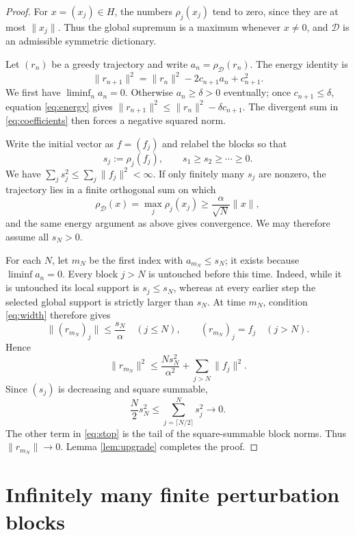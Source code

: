 \documentclass[11pt]{article}
\newcommand{\D}{\mathcal D}
\newcommand{\rhoD}{\rho_{\mathcal D}}
\begin{document}
\begin{proof}
For $x=(x_j)\in H$, the numbers $\rho_j(x_j)$ tend to zero, since they are at
most $\|x_j\|$.  Thus the global supremum is a maximum whenever $x\ne0$, and
$\D$ is an admissible symmetric dictionary.

Let $(r_n)$ be a greedy trajectory and write $a_n=\rhoD(r_n)$.  The energy
identity is
\begin{equation}\label{eq:energy}
 \|r_{n+1}\|^2
 =\|r_n\|^2-2c_{n+1}a_n+c_{n+1}^2.
\end{equation}
We first have $\liminf_n a_n=0$.  Otherwise $a_n\ge\delta>0$ eventually; once
$c_{n+1}\le\delta$, equation \eqref{eq:energy} gives
$\|r_{n+1}\|^2\le\|r_n\|^2-\delta c_{n+1}$.  The divergent sum in
\eqref{eq:coefficients} then forces a negative squared norm.

Write the initial vector as $f=(f_j)$ and relabel the blocks so that
\[
 s_j:=\rho_j(f_j),\qquad s_1\ge s_2\ge\cdots\ge0.
\]
We have $\sum_j s_j^2\le\sum_j\|f_j\|^2<\infty$.  If only finitely many
$s_j$ are nonzero, the trajectory lies in a finite orthogonal sum on which
\[
 \rhoD(x)=\max_j\rho_j(x_j)
 \ge\frac{\alpha}{\sqrt N}\|x\|,
\]
and the same energy argument as above gives convergence.  We may therefore
assume all $s_N>0$.

For each $N$, let $m_N$ be the first index with $a_{m_N}\le s_N$; it exists
because $\liminf a_n=0$.  Every block $j>N$ is untouched before this time.
Indeed, while it is untouched its local support is $s_j\le s_N$, whereas at
every earlier step the selected global support is strictly larger than $s_N$.
At time $m_N$, condition \eqref{eq:width} therefore gives
\[
 \|(r_{m_N})_j\|\le\frac{s_N}{\alpha}\quad(j\le N),
 \qquad (r_{m_N})_j=f_j\quad(j>N).
\]
Hence
\begin{equation}\label{eq:stop}
 \|r_{m_N}\|^2
 \le \frac{N s_N^2}{\alpha^2}+\sum_{j>N}\|f_j\|^2.
\end{equation}
Since $(s_j)$ is decreasing and square summable,
\[
 \frac N2s_N^2\le
 \sum_{j=\lceil N/2\rceil}^{N}s_j^2\longrightarrow0.
\]
The other term in \eqref{eq:stop} is the tail of the square-summable block
norms.  Thus $\|r_{m_N}\|\to0$.  Lemma \ref{lem:upgrade} completes the proof.
\end{proof}

\section{Infinitely many finite perturbation blocks}
\end{document}
